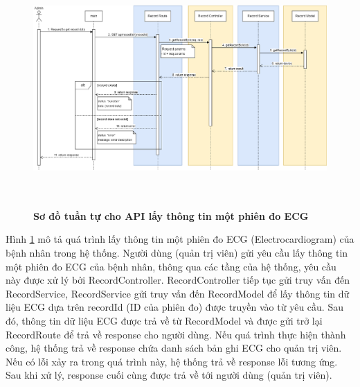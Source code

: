 \begin{figure}[H]
  \centering
  \includegraphics[width=16cm,height=9cm]{Images/sequence_api/getRecordById.png}
  \caption[Sơ đồ tuần tự cho API lấy thông tin một phiên đo ECG ]{\bfseries \fontsize{12pt}{0pt}
  \selectfont Sơ đồ tuần tự cho API lấy thông tin một phiên đo ECG }
  \label{api_getRecordById} %
\end{figure}
Hình \ref{api_getRecordById} mô tả quá trình lấy thông tin một phiên đo ECG (Electrocardiogram) của bệnh nhân trong hệ thống. Người dùng (quản trị viên) gửi yêu cầu lấy thông tin một phiên đo ECG của bệnh nhân, thông qua các tầng của hệ thống, 
yêu cầu này được xử lý bởi RecordController. RecordController tiếp tục gửi truy vấn đến RecordService, RecordService gửi truy vấn đến RecordModel để lấy thông tin dữ liệu ECG dựa trên recordId (ID của phiên đo) được truyền vào từ yêu cầu. 
Sau đó, thông tin dữ liệu ECG được trả về từ RecordModel và được gửi trở lại RecordRoute để trả về response cho người dùng. Nếu quá trình thực hiện thành công, hệ thống trả về response chứa danh sách bản ghi ECG cho quản trị viên. Nếu có lỗi xảy ra
 trong quá trình này, hệ thống trả về response lỗi tương ứng. Sau khi xử lý, response cuối cùng được trả về tới người dùng (quản trị viên).

